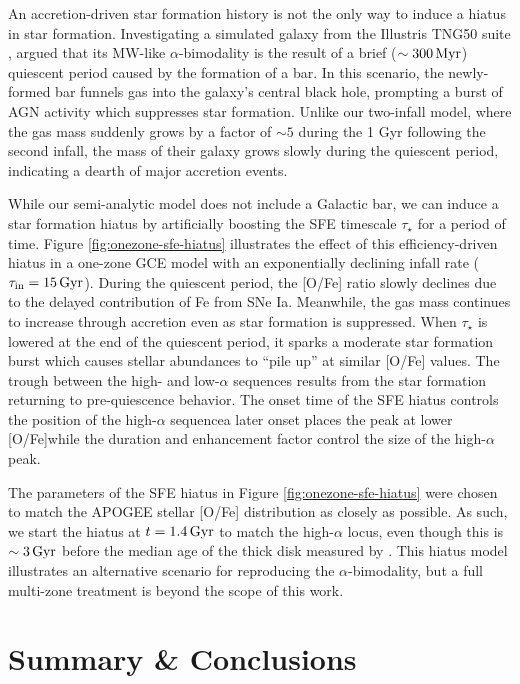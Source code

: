 \documentclass[twocolumn,twocolappendix,linenumbers]{aastex631}
\newcommand{\Gyr}{\,{\rm Gyr}}
\begin{document}
An accretion-driven star formation history is not the only way to induce a hiatus in star formation. Investigating a simulated galaxy from the Illustris TNG50 suite \citep{pillepich_first_2019,nelson_first_2019,nelson_illustristng_2019}, \citet{beane_rising_2024} argued that its MW-like $\alpha$-bimodality is the result of a brief ($\sim300\,{\rm Myr}$) quiescent period caused by the formation of a bar. In this scenario, the newly-formed bar funnels gas into the galaxy's central black hole, prompting a burst of AGN activity which suppresses star formation. Unlike our two-infall model, where the gas mass suddenly grows by a factor of $\sim5$ during the 1 Gyr following the second infall, the mass of their galaxy grows slowly during the quiescent period, indicating a dearth of major accretion events.

While our semi-analytic model does not include a Galactic bar, we can induce a star formation hiatus by artificially boosting the SFE timescale $\tau_\star$ for a period of time. Figure \ref{fig:onezone-sfe-hiatus} illustrates the effect of this efficiency-driven hiatus in a one-zone GCE model with an exponentially declining infall rate ($\tau_{\rm in}=15\Gyr$). During the quiescent period, the [O/Fe] ratio slowly declines due to the delayed contribution of Fe from SNe Ia. Meanwhile, the gas mass continues to increase through accretion even as star formation is suppressed. When $\tau_\star$ is lowered at the end of the quiescent period, it sparks a moderate star formation burst which causes stellar abundances to ``pile up'' at similar [O/Fe] values. The trough between the high- and low-$\alpha$ sequences results from the star formation returning to pre-quiescence behavior. The onset time of the SFE hiatus controls the position of the high-$\alpha$ sequence\textemdash a later onset places the peak at lower [O/Fe]\textemdash while the duration and enhancement factor control the size of the high-$\alpha$ peak.

The parameters of the SFE hiatus in Figure \ref{fig:onezone-sfe-hiatus} were chosen to match the APOGEE stellar [O/Fe] distribution as closely as possible. As such, we start the hiatus at $t=1.4\Gyr$ to match the high-$\alpha$ locus, even though this is $\sim3\Gyr$ before the median age of the thick disk measured by \citet{pinsonneault_apokasc-3_2025}. This hiatus model illustrates an alternative scenario for reproducing the $\alpha$-bimodality, but a full multi-zone treatment is beyond the scope of this work.

\section{Summary \& Conclusions}
\label{sec:conclusions}
\end{document}
